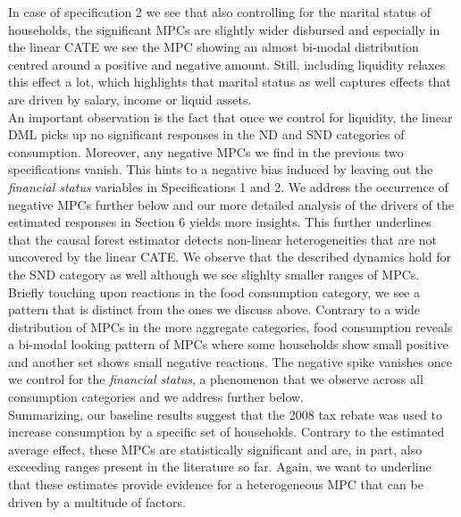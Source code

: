 In case of specification 2 we see that also controlling for the marital status of households, the significant MPCs are slightly wider disbursed and especially in the linear CATE we see the MPC showing an almost bi-modal distribution centred around a positive and negative amount. Still, including liquidity relaxes this effect a lot, which highlights that marital status as well captures effects that are driven by salary, income or liquid assets.\\ 
An important observation is the fact that once we control for liquidity, the linear DML picks up no significant responses in the ND and SND categories of consumption. Moreover, any negative MPCs we find in the previous two specifications vanish. This hints to a negative bias induced by leaving out the \textit{financial status} variables in Specifications 1 and 2. We address the occurrence of negative MPCs further below and our more detailed analysis of the drivers of the estimated responses in Section 6 yields more insights. This further underlines that the causal forest estimator detects non-linear heterogeneities that are not uncovered by the linear CATE. We observe that the described dynamics hold for the SND category as well although we see slighlty smaller ranges of MPCs. \\
Briefly touching upon reactions in the food consumption category, we see a pattern that is distinct from the ones we discuss above. Contrary to a wide distribution of MPCs in the more aggregate categories, food consumption reveals a bi-modal looking pattern of MPCs where some households show small positive and another set shows small negative reactions. The negative spike vanishes once we control for the \textit{financial status}, a phenomenon that we observe across all consumption categories and we address further below. \\
Summarizing, our baseline results suggest that the 2008 tax rebate was used to increase consumption by a specific set of households. Contrary to the estimated average effect, these MPCs are statistically significant and are, in part, also exceeding ranges present in the literature so far. Again, we want to underline that these estimates provide evidence for a heterogeneous MPC that can be driven by a multitude of factors. \\
